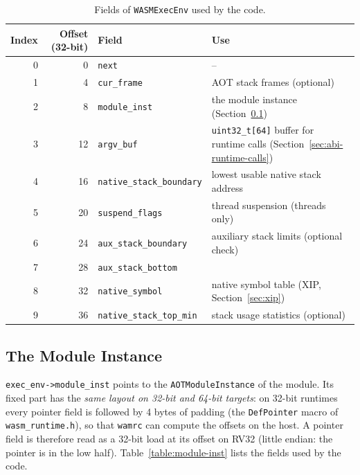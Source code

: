 \documentclass{article}
\begin{document}
\begin{table}[H]
\centering
\begin{tabular}{rrll}
    \hline
    Index & Offset (32-bit) & Field & Use \\
    \hline
    0  & 0  & \verb|next| & -- \\
    1  & 4  & \verb|cur_frame| & AOT stack frames (optional) \\
    2  & 8  & \verb|module_inst| & the module instance (Section~\ref{sec:abi-module-inst}) \\
    3  & 12 & \verb|argv_buf| & \verb|uint32_t[64]| buffer for runtime calls (Section~\ref{sec:abi-runtime-calls}) \\
    4  & 16 & \verb|native_stack_boundary| & lowest usable native stack address \\
    5  & 20 & \verb|suspend_flags| & thread suspension (threads only) \\
    6  & 24 & \verb|aux_stack_boundary| & auxiliary stack limits (optional check) \\
    7  & 28 & \verb|aux_stack_bottom| & \\
    8  & 32 & \verb|native_symbol| & native symbol table (XIP, Section~\ref{sec:xip}) \\
    9  & 36 & \verb|native_stack_top_min| & stack usage statistics (optional) \\
    \hline
\end{tabular}
\caption{Fields of \texttt{WASMExecEnv} used by the code.}
\label{table:exec-env}
\end{table}

\subsection{The Module Instance}
\label{sec:abi-module-inst}
\verb|exec_env->module_inst| points to the \verb|AOTModuleInstance| of the module.
Its fixed part has the \emph{same layout on 32-bit and 64-bit targets}: on 32-bit runtimes every pointer field is followed by 4 bytes of padding (the \verb|DefPointer| macro of \texttt{wasm\_runtime.h}), so that \texttt{wamrc} can compute the offsets on the host.
A pointer field is therefore read as a 32-bit load at its offset on RV32 (little endian: the pointer is in the low half).
Table~\ref{table:module-inst} lists the fields used by the code.
\end{document}
